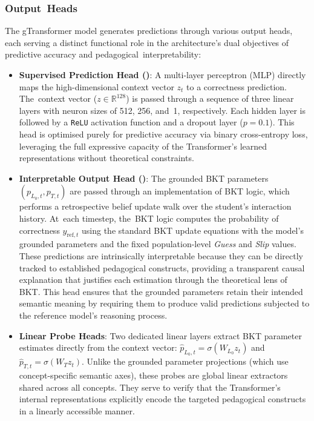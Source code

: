 \documentclass[applsci,article,accept,moreauthors,pdftex]{Definitions/mdpi}
\begin{document}
\subsubsection{Output~Heads} \label{sec_output_heads}

The gTransformer model generates predictions through various output heads, each serving a distinct functional role in the architecture's dual objectives of predictive accuracy and pedagogical~interpretability:
\begin{itemize}
    \item \textbf{Supervised Prediction Head ()}: {A multi-layer perceptron (MLP) directly maps the high-dimensional context vector $z_t$ to a correctness prediction. The~context vector ($z \in \mathbb{R}^{128}$) is passed through a sequence of three linear layers with neuron sizes of 512, 256, and~1, respectively. Each hidden layer is followed by a \texttt{ReLU} activation function and a dropout layer ($p=0.1$).} This head is optimised purely for predictive accuracy via binary cross-entropy loss, leveraging the full expressive capacity of the Transformer's learned representations without theoretical constraints.
    \item \textbf{Interpretable Output Head ()}: The grounded BKT parameters $(p_{L_0,t}, p_{T,t})$ are passed through an implementation of BKT logic, which performs a retrospective belief update walk over the student's interaction history. At~each timestep, the~BKT logic computes the probability of correctness $\hat{y}_{\text{ref},t}$ using the standard BKT update equations with the model's grounded parameters and the fixed population-level \textit{Guess} and \textit{Slip} values. These predictions are intrinsically interpretable because they can be directly tracked to established pedagogical constructs, providing a transparent causal explanation that justifies each estimation through the theoretical lens of BKT. This head ensures that the grounded parameters retain their intended semantic meaning by requiring them to produce valid predictions subjected to the reference model's reasoning process.
    \item \textbf{Linear Probe Heads}: Two dedicated linear layers extract BKT parameter estimates directly from the context vector: $\hat{p}_{L_0,t} = \sigma(W_{L_0} z_t)$ and $\hat{p}_{T,t} = \sigma(W_{T} z_t)$. Unlike the grounded parameter projections (which use concept-specific semantic axes), these probes are global linear extractors shared across all concepts. They serve to verify that the Transformer's internal representations explicitly encode the targeted pedagogical constructs in a linearly accessible manner.
\end{itemize}
\end{document}
